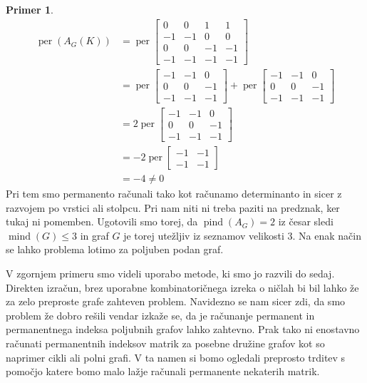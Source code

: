 \documentclass[12pt,a4paper,twoside]{article}
\theoremstyle{definition} %
\newtheorem{primer}[definicija]{Primer}
\theoremstyle{plain} %
\numberwithin{equation}{section}  %
\DeclareMathOperator{\per}{per}
\DeclareMathOperator{\mind}{mind}
\DeclareMathOperator{\pind}{pind}
\begin{document}
\begin{primer}
\begin{equation*}
\begin{split}
\per(A_G(K)) &= \per \left[ \begin{matrix} 0 & 0 & 1 & 1 \\ -1 & -1 & 0 & 0 \\ 0 & 0 & -1 & -1 \\ -1 & -1 & -1 & -1 \end{matrix} \right] \\
&=\per \left[ \begin{matrix} -1 & -1 & 0 \\ 0 & 0 & -1 \\ -1 & -1 & -1 \end{matrix} \right] + \per \left[ \begin{matrix} -1 & -1 & 0 \\ 0 & 0 & -1 \\ -1 & -1 & -1 \end{matrix} \right] \\
&= 2 \per\left[ \begin{matrix} -1 & -1 & 0 \\ 0 & 0 & -1 \\ -1 & -1 & -1 \end{matrix} \right] \\
& =-2 \per \left[ \begin{matrix} -1 & -1 \\ -1 & -1 \end{matrix} \right] \\
&=-4 \neq 0
\end{split}
\end{equation*}
Pri tem smo permanento računali tako kot računamo determinanto in sicer z razvojem po vrstici ali stolpcu. Pri nam niti ni treba paziti na predznak, ker tukaj ni pomemben. Ugotovili smo torej, da $\pind(A_G) = 2$ iz česar sledi $\mind(G) \le 3$ in graf $G$ je torej utežljiv iz seznamov velikosti $3$. Na enak način se lahko problema lotimo za poljuben podan graf.
\end{primer}
V zgornjem primeru smo videli uporabo metode, ki smo jo razvili do sedaj. Direkten izračun, brez uporabne kombinatoričnega izreka o ničlah bi bil lahko že za zelo preproste grafe zahteven problem. Navidezno se nam sicer zdi, da smo problem že dobro rešili vendar izkaže se, da je računanje permanent in permanentnega indeksa poljubnih grafov lahko zahtevno. Prak tako ni enostavno računati permanentnih indeksov matrik za posebne družine grafov kot so naprimer cikli ali polni grafi. V ta namen si bomo ogledali preprosto trditev s pomočjo katere bomo malo lažje računali permanente nekaterih matrik.
\end{document}
